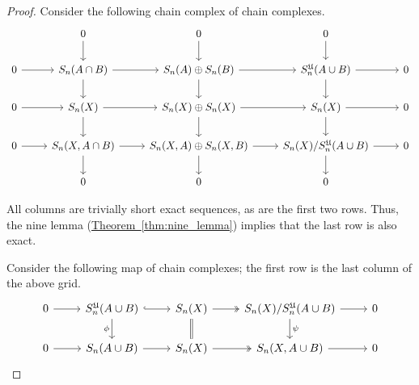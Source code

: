 \documentclass[main.tex]{subfiles}
\begin{document}
\begin{proof}
  Consider the following chain complex of chain complexes.
  \begin{equation*}
    \begin{tikzcd}
      & 0
      \arrow[d]
      & 0
      \arrow[d]
      & 0
      \arrow[d]
      \\
      0
      \arrow[r]
      & S_{n}(A \cap B)
      \arrow[r]
      \arrow[d]
      & S_{n}(A) \oplus S_{n}(B)
      \arrow[r]
      \arrow[d]
      & S_{n}^{\mathfrak{U}}(A \cup B)
      \arrow[r]
      \arrow[d]
      & 0
      \\
      0
      \arrow[r]
      & S_{n}(X)
      \arrow[r]
      \arrow[d]
      & S_{n}(X) \oplus S_{n}(X)
      \arrow[r]
      \arrow[d]
      & S_{n}(X)
      \arrow[r]
      \arrow[d]
      & 0
      \\
      0
      \arrow[r]
      & S_{n}(X, A \cap B)
      \arrow[r]
      \arrow[d]
      & S_{n}(X, A) \oplus S_{n}(X, B)
      \arrow[r]
      \arrow[d]
      & S_{n}(X) / S_{n}^{\mathfrak{U}}(A \cup B)
      \arrow[r]
      \arrow[d]
      & 0
      \\
      & 0
      & 0
      & 0
    \end{tikzcd}
  \end{equation*}

  All columns are trivially short exact sequences, as are the first two rows. Thus, the nine lemma (\hyperref[thm:nine_lemma]{Theorem~\ref*{thm:nine_lemma}}) implies that the last row is also exact.

  Consider the following map of chain complexes; the first row is the last column of the above grid.
  \begin{equation*}
    \begin{tikzcd}
      0
      \arrow[r]
      & S_{n}^{\mathfrak{U}}(A \cup B)
      \arrow[r, hook]
      \arrow[d, swap, "\phi"]
      & S_{n}(X)
      \arrow[r, two heads]
      \arrow[d, equals]
      & S_{n}(X)/S_{n}^{\mathfrak{U}}(A \cup B)
      \arrow[r]
      \arrow[d, "\psi"]
      & 0
      \\
      0
      \arrow[r]
      & S_{n}(A \cup B)
      \arrow[r, right]
      & S_{n}(X)
      \arrow[r, two heads]
      & S_{n}(X, A \cup B)
      \arrow[r]
      & 0
    \end{tikzcd}
  \end{equation*}


\end{proof}
\end{document}
